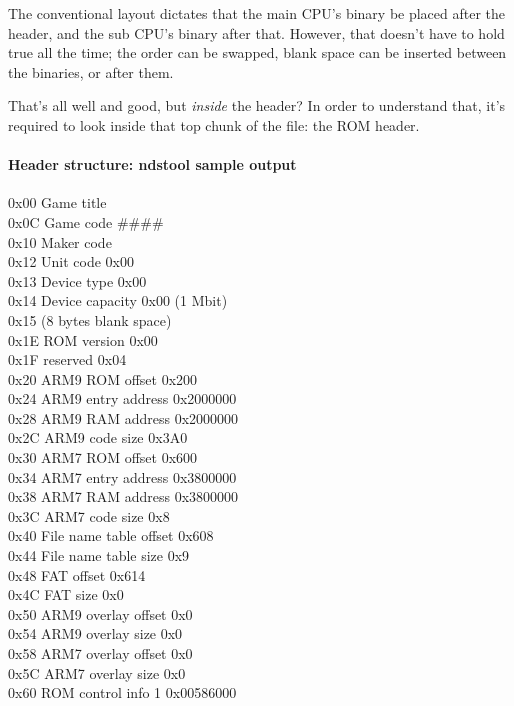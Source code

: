 \documentclass[11pt,a4paper]{article}
\let\oldparagraph\paragraph
\renewcommand{\paragraph}[1]{\oldparagraph{#1}\mbox{}}
\begin{document}
The conventional layout dictates that the main CPU's binary be placed
after the header, and the sub CPU's binary after that. However, that
doesn't have to hold true all the time; the order can be swapped, blank
space can be inserted between the binaries, or after them.

That's all well and good, but \emph{inside} the header? In order to
understand that, it's required to look inside that top chunk of the
file: the ROM header.

\newpage

\paragraph{Header structure: ndstool sample
output}\label{header-structure-ndstool-sample-output}

0x00 Game title 
\\0x0C Game code \#\#\#\# 
\\0x10 Maker code 
\\0x12 Unit code 0x00 
\\0x13 Device type 0x00 
\\0x14 Device capacity 0x00 (1 Mbit) 
\\{0x15 (8 bytes blank space)} 
\\0x1E ROM version 0x00 
\\0x1F reserved 0x04 
\\0x20 ARM9 ROM offset 0x200 
\\0x24 ARM9 entry address 0x2000000 
\\0x28 ARM9 RAM address 0x2000000 
\\0x2C ARM9 code size 0x3A0 
\\0x30 ARM7 ROM offset 0x600 
\\0x34 ARM7 entry address 0x3800000 
\\0x38 ARM7 RAM address 0x3800000 
\\0x3C ARM7 code size 0x8 
\\0x40 File name table offset 0x608 
\\0x44 File name table size 0x9
\\0x48 FAT offset 0x614 
\\0x4C FAT size 0x0 
\\0x50 ARM9 overlay offset 0x0
\\0x54 ARM9 overlay size 0x0 
\\0x58 ARM7 overlay offset 0x0 
\\0x5C ARM7 overlay size 0x0 
\\0x60 ROM control info 1 0x00586000 
\end{document}
